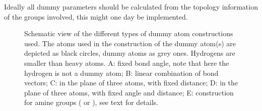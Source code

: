 Ideally all dummy parameters should be calculated from the topology
information of the groups involved, this might one day be implemented.

\begin{figure}
\centerline{}
\caption[Schematic view of the different types of dummy atom
constructions used.]{Schematic view of the different types of dummy
atom constructions used. The atoms used in the construction of the
dummy atom(s) are depicted as black circles, dummy atoms as grey
ones. Hydrogens are smaller than heavy atoms. {\sf A}: fixed bond
angle, note that here the hydrogen is not a dummy atom; {\sf B}:
linear combination of bond vectors; {\sf C}: in the plane of three
atoms, with fixed distance; {\sf D}: in the plane of three atoms, with
fixed angle and distance; {\sf E}: construction for amine groups
({\amine} or {\aminep}), see text for details.}
\label{fig:dumtypes}
\end{figure}

